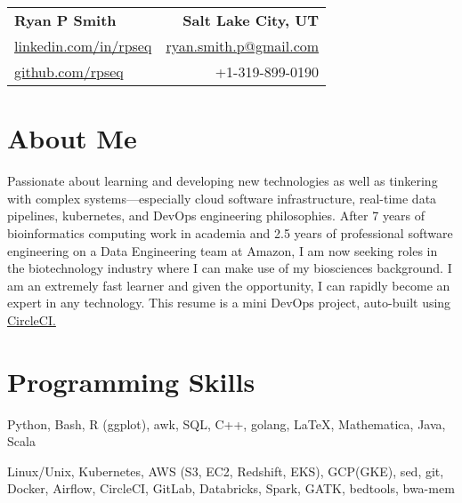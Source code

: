 
\RequirePackage{preamble}



\begin{tabular*}{\textwidth}{l@{\extracolsep{\fill}}r}
    \textbf{{\Large Ryan P Smith}} & \textbf{Salt Lake City, UT} \\
    \href{http://www.linkedin.com/in/rpseq}{linkedin.com/in/rpseq} &
    \href{mailto:ryan.smith.p@gmail.com}{ryan.smith.p@gmail.com} \\
    \href{https://github.com/RPSeq}{github.com/rpseq} & +1-319-899-0190 \\
\end{tabular*}

\section{About Me}
      
   \small{Passionate about learning and developing new technologies as well as tinkering with complex systems---especially cloud software infrastructure, real-time data pipelines, kubernetes, and DevOps engineering philosophies. After 7 years of bioinformatics computing work in academia and 2.5 years of professional software engineering on a Data Engineering team at Amazon, I am now seeking roles in the biotechnology industry where I can make use of my biosciences background. I am an extremely fast learner and given the opportunity, I can rapidly become an expert in any technology. This resume is a mini DevOps project, auto-built using \href{https://circleci.com/gh/RPSeq/resume}{CircleCI.}}

    
\section{Programming Skills}
    \resumeSubHeadingListStart

        {Python, Bash, R (ggplot), awk, SQL, C++, golang, \LaTeX, Mathematica, Java, Scala}
          
        {Linux/Unix, Kubernetes, AWS (S3, EC2, Redshift, EKS), GCP(GKE), sed, git, Docker, Airflow, CircleCI, GitLab, Databricks, Spark, GATK, bedtools, bwa-mem}
          
